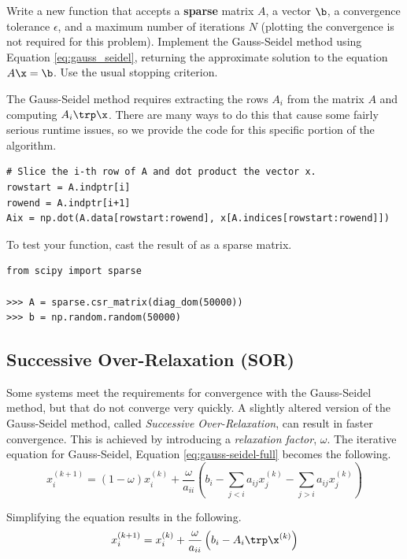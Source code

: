 \begin{problem} %
Write a new function that accepts a \textbf{sparse} matrix $A$, a vector $\b$, a convergence tolerance $\epsilon$, and a maximum number of iterations $N$ (plotting the convergence is not required for this problem).
Implement the Gauss-Seidel method using Equation \ref{eq:gauss_seidel}, returning the approximate solution to the equation $A\x = \b$.
Use the usual stopping criterion.

The Gauss-Seidel method requires extracting the rows $A_i$ from the matrix $A$ and computing $A_i\trp\x$.
There are many ways to do this that cause some fairly serious runtime issues, so we provide the code for this specific portion of the algorithm.

\begin{lstlisting}
# Slice the i-th row of A and dot product the vector x.
rowstart = A.indptr[i]
rowend = A.indptr[i+1]
Aix = np.dot(A.data[rowstart:rowend], x[A.indices[rowstart:rowend]])
\end{lstlisting}

To test your function, cast the result of  as a sparse matrix.

\begin{lstlisting}
from scipy import sparse

>>> A = sparse.csr_matrix(diag_dom(50000))
>>> b = np.random.random(50000)
\end{lstlisting}
\end{problem}

\subsection*{Successive Over-Relaxation (SOR)} %

Some systems meet the requirements for convergence with the Gauss-Seidel method, but that do not converge very quickly.
A slightly altered version of the Gauss-Seidel method, called \emph{Successive Over-Relaxation}, can result in faster convergence.
This is achieved by introducing a \emph{relaxation factor}, $\omega$.
The iterative equation for Gauss-Seidel, Equation \ref{eq:gauss-seidel-full} becomes the following.
\[x^{(k+1)}_i = (1-\omega)x^{(k)}_i + \frac{\omega}{a_{ii}} \left(b_i - \sum_{j < i}a_{ij}x^{(k)}_j - \sum_{j > i}a_{ij}x^{(k)}_j \right)\]

Simplifying the equation results in the following.
\begin{equation}
x^{(k+1)}_i = x^{(k)}_i + \frac{\omega}{a_{ii}}\left( b_i - A_i\trp\x^{(k)}\right)
\label{eq:sor}
\end{equation}

